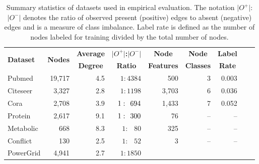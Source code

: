 \documentclass[letterpaper, conference]{IEEEtran}  %
\begin{document}
\begin{table}[ht]
\begin{center}
\caption[Caption for Table 1]{Summary statistics of datasets used in empirical evaluation. The notation $\vert\mathit{O}^+\vert$:$\vert\mathit{O}^-\vert$ denotes the ratio of observed present (positive) edges to absent (negative) edges and is a measure of class imbalance. Label rate is defined as the number of nodes labeled for training divided by the total number of nodes.}
\begin{adjustbox}{width=0.5\textwidth}
	\begin{tabular} {l  r  r  r  r  r  r  r  r}
	\hline
	\multicolumn{1}{l}{\multirow{2}{*}{\textbf{Dataset}}} &
	\multicolumn{1}{c}{\multirow{2}{*}{\textbf{Nodes}}} &
    \multicolumn{1}{c}{\multirow{1}{*}{\textbf{Average}}} &
	\multicolumn{1}{c}{\multirow{1}{*}{\textbf{$\vert\mathit{O}^+\vert$:$\vert\mathit{O}^-\vert$}}} &
	\multicolumn{1}{c}{\multirow{1}{*}{\textbf{Node}}} &
	\multicolumn{1}{c}{\multirow{1}{*}{\textbf{Node}}} &
	\multicolumn{1}{c}{\multirow{1}{*}{\textbf{Label}}} \\
    & {}
    & \multicolumn{1}{c}{\multirow{1}{*}{\textbf{Degree}}}
    & \multicolumn{1}{c}{\multirow{1}{*}{\textbf{Ratio}}}
    & \multicolumn{1}{c}{\multirow{1}{*}{\textbf{Features}}}
    & \multicolumn{1}{c}{\multirow{1}{*}{\textbf{Classes}}}
    & \multicolumn{1}{c}{\multirow{1}{*}{\textbf{Rate}}} \\
    \hline \hline
    Pubmed
				& 19,717
				& 4.5
                & $1:4384$
				& 500
				& 3
				& 0.003 \\
    Citeseer
				& 3,327 
				& 2.8
                & $1:1198$
				& 3,703
				& 6
				& 0.036 \\
	Cora	
				& 2,708
				& 3.9
                & $1: \hspace{4.5pt} 694$
				& 1,433
				& 7
				& 0.052 \\
	Protein
					& 2,617
					& 9.1
                    & $1: \hspace{4.5pt} 300$
					& 76
					& --
					& -- \\
	Metabolic
					& 668
					& 8.3
                    & $1: \hspace{9pt} 80$
					& 325
					& --
					& -- \\
	Conflict
					& 130
					& 2.5
                    & $1: \hspace{9pt} 52$
					& 3
					& --
					& -- \\
	PowerGrid
				 & 4,941
				 & 2.7
                 & $1:1850$

\end{tabular}
\end{adjustbox}
\end{center}
\end{table}
\end{document}
